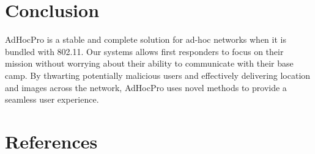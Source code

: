 \documentclass[letterpaper]{article}
\begin{document}
\section{Conclusion}

AdHocPro is a stable and complete solution for ad-hoc networks when it is bundled with 802.11. Our systems allows first responders to
focus on their mission without worrying about their ability to communicate with their base camp. By thwarting potentially malicious
users and effectively delivering location and images across the network, AdHocPro uses novel methods to provide a seamless user experience.

\section{References}
\end{document}
